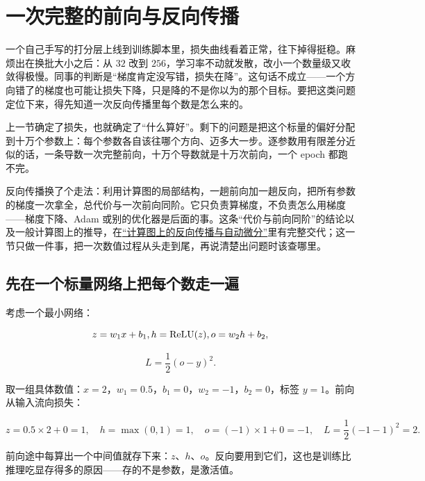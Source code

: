 \section{一次完整的前向与反向传播}
\label{sec:14-Deep-Learning/02-Losses-and-Backpropagation/02}

一个自己手写的打分层上线到训练脚本里，损失曲线看着正常，往下掉得挺稳。麻烦出在换批大小之后：从 \(32\) 改到 \(256\)，学习率不动就发散，改小一个数量级又收敛得极慢。同事的判断是``梯度肯定没写错，损失在降''。这句话不成立——一个方向错了的梯度也可能让损失下降，只是降的不是你以为的那个目标。要把这类问题定位下来，得先知道一次反向传播里每个数是怎么来的。

上一节确定了损失，也就确定了``什么算好''。剩下的问题是把这个标量的偏好分配到十万个参数上：每个参数各自该往哪个方向、迈多大一步。逐参数用有限差分近似的话，一条导数一次完整前向，十万个导数就是十万次前向，一个 epoch 都跑不完。

反向传播换了个走法：利用计算图的局部结构，一趟前向加一趟反向，把所有参数的梯度一次拿全，总代价与一次前向同阶。它只负责算梯度，不负责怎么用梯度——梯度下降、Adam 或别的优化器是后面的事。这条``代价与前向同阶''的结论以及一般计算图上的推导，在\hyperref[sec:10-Matrix-Calculus/04-Applications/03]{``计算图上的反向传播与自动微分''}里有完整交代；这一节只做一件事，把一次数值过程从头走到尾，再说清楚出问题时该查哪里。

\subsection{先在一个标量网络上把每个数走一遍}

考虑一个最小网络：

\[
z=w_1x+b_1,\space
h=\operatorname{ReLU}(z),\space
o=w_2h+b_2,
\]

\[
L=\frac12(o-y)^2.
\]

取一组具体数值：\(x=2\)，\(w_1=0.5\)，\(b_1=0\)，\(w_2=-1\)，\(b_2=0\)，标签 \(y=1\)。前向从输入流向损失：

\[
z=0.5\times 2+0=1,\quad
h=\max(0,1)=1,\quad
o=(-1)\times 1+0=-1,\quad
L=\frac12(-1-1)^2=2.
\]

前向途中每算出一个中间值就存下来：\(z\)、\(h\)、\(o\)。反向要用到它们，这也是训练比推理吃显存得多的原因——存的不是参数，是激活值。

